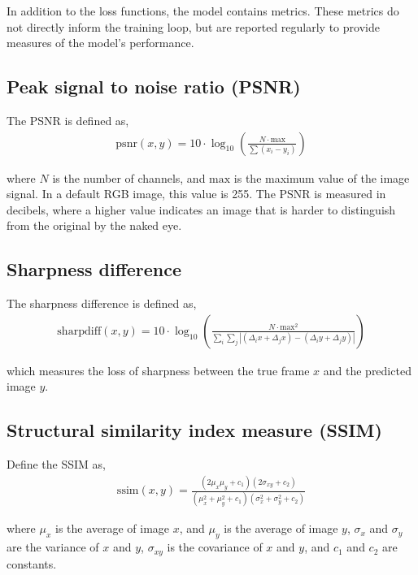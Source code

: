\documentclass{article}
\begin{document}
In addition to the loss functions, the model contains metrics. These metrics do not directly inform the training loop, but are reported regularly to provide measures of the model's performance.

\subsection{Peak signal to noise ratio (PSNR)}

The PSNR is defined as,
\begin{align*}
    \mathrm{psnr}(x, y) = 10 \cdot \log_{10}\left( \frac{N \cdot
    \mathrm{max}}{\sum (x_i - y_i)} \right)
\end{align*}

where $N$ is the number of channels, and $\mathrm{max}$ is the maximum value of the image signal. In a default RGB image, this value is 255. The PSNR is measured in decibels, where a higher value indicates an image that is harder to distinguish from the original by the naked eye.

\subsection{Sharpness difference}

The sharpness difference is defined as,
\begin{align*}
    \mathrm{sharpdiff}(x, y) = 10 \cdot \log_{10}\left(\frac{N \cdot
    \mathrm{max}^2}{\sum_i \sum_j |(\Delta_i x + \Delta_j x) - (\Delta_i
    y + \Delta_j y)|}\right)
\end{align*}

which measures the loss of sharpness between the true frame $x$ and the predicted image $y$.

\subsection{Structural similarity index measure (SSIM)}

Define the SSIM \cite{ssim} as,
\begin{align*}
    \mathrm{ssim}(x, y) = \frac{(2\mu_x\mu_y + c_1)(2\sigma_{xy} + c_2)}
    {(\mu_x^2 + \mu_y^2 + c_1)(\sigma_x^2 + \sigma_y^2 + c_2)}
\end{align*}

where $\mu_x$ is the average of image $x$, and $\mu_y$ is the average of image $y$, $\sigma_x$ and $\sigma_y$ are the variance of $x$ and $y$, $\sigma_{xy}$ is the covariance of $x$ and $y$, and $c_1$ and $c_2$ are constants.
\end{document}
